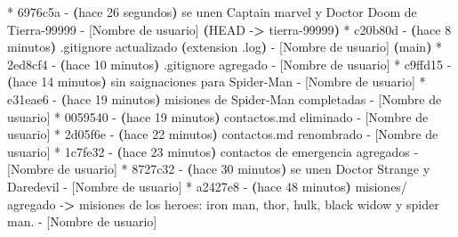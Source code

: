 \documentclass[
]{book}
\newenvironment{Shaded}{\begin{snugshade}}{\end{snugshade}}
\newcommand{\AttributeTok}[1]{\textcolor[rgb]{0.13,0.29,0.53}{#1}}
\newcommand{\ErrorTok}[1]{\textcolor[rgb]{0.64,0.00,0.00}{\textbf{#1}}}
\newcommand{\ExtensionTok}[1]{#1}
\newcommand{\KeywordTok}[1]{\textcolor[rgb]{0.13,0.29,0.53}{\textbf{#1}}}
\newcommand{\NormalTok}[1]{#1}
\newcommand{\OperatorTok}[1]{\textcolor[rgb]{0.81,0.36,0.00}{\textbf{#1}}}
\begin{document}
\begin{Shaded}
\begin{Highlighting}[]
\ExtensionTok{*}\NormalTok{ 6976c5a }\AttributeTok{{-}} \ErrorTok{(}\ExtensionTok{hace}\NormalTok{ 26 segundos}\KeywordTok{)} \ExtensionTok{se}\NormalTok{ unen Captain marvel y Doctor Doom de Tierra{-}99999 }\AttributeTok{{-}}\NormalTok{ [Nombre de usuario] }\ErrorTok{(}\ExtensionTok{HEAD} \AttributeTok{{-}}\OperatorTok{\textgreater{}}\NormalTok{ tierra{-}99999}\KeywordTok{)}
\ExtensionTok{*}\NormalTok{ c20b80d }\AttributeTok{{-}} \ErrorTok{(}\ExtensionTok{hace}\NormalTok{ 8 minutos}\KeywordTok{)} \ExtensionTok{.gitignore}\NormalTok{ actualizado }\ErrorTok{(}\ExtensionTok{extension}\NormalTok{ .log}\KeywordTok{)} \ExtensionTok{{-}}\NormalTok{ [Nombre de usuario] }\ErrorTok{(}\ExtensionTok{main}\KeywordTok{)}
\ExtensionTok{*}\NormalTok{ 2ed8cf4 }\AttributeTok{{-}} \ErrorTok{(}\ExtensionTok{hace}\NormalTok{ 10 minutos}\KeywordTok{)} \ExtensionTok{.gitignore}\NormalTok{ agregado }\AttributeTok{{-}}\NormalTok{ [Nombre de usuario]}
\ExtensionTok{*}\NormalTok{ c9ffd15 }\AttributeTok{{-}} \ErrorTok{(}\ExtensionTok{hace}\NormalTok{ 14 minutos}\KeywordTok{)} \ExtensionTok{sin}\NormalTok{ saignaciones para Spider{-}Man }\AttributeTok{{-}}\NormalTok{ [Nombre de usuario]}
\ExtensionTok{*}\NormalTok{ e31eae6 }\AttributeTok{{-}} \ErrorTok{(}\ExtensionTok{hace}\NormalTok{ 19 minutos}\KeywordTok{)} \ExtensionTok{misiones}\NormalTok{ de Spider{-}Man completadas }\AttributeTok{{-}}\NormalTok{ [Nombre de usuario]}
\ExtensionTok{*}\NormalTok{ 0059540 }\AttributeTok{{-}} \ErrorTok{(}\ExtensionTok{hace}\NormalTok{ 19 minutos}\KeywordTok{)} \ExtensionTok{contactos.md}\NormalTok{ eliminado }\AttributeTok{{-}}\NormalTok{ [Nombre de usuario]}
\ExtensionTok{*}\NormalTok{ 2d05f6e }\AttributeTok{{-}} \ErrorTok{(}\ExtensionTok{hace}\NormalTok{ 22 minutos}\KeywordTok{)} \ExtensionTok{contactos.md}\NormalTok{ renombrado }\AttributeTok{{-}}\NormalTok{ [Nombre de usuario]}
\ExtensionTok{*}\NormalTok{ 1c7fe32 }\AttributeTok{{-}} \ErrorTok{(}\ExtensionTok{hace}\NormalTok{ 23 minutos}\KeywordTok{)} \ExtensionTok{contactos}\NormalTok{ de emergencia agregados }\AttributeTok{{-}}\NormalTok{ [Nombre de usuario]}
\ExtensionTok{*}\NormalTok{ 8727c32 }\AttributeTok{{-}} \ErrorTok{(}\ExtensionTok{hace}\NormalTok{ 30 minutos}\KeywordTok{)} \ExtensionTok{se}\NormalTok{ unen Doctor Strange y Daredevil }\AttributeTok{{-}}\NormalTok{ [Nombre de usuario]}
\ExtensionTok{*}\NormalTok{ a2427e8 }\AttributeTok{{-}} \ErrorTok{(}\ExtensionTok{hace}\NormalTok{ 48 minutos}\KeywordTok{)} \ExtensionTok{misiones/}\NormalTok{ agregado }\AttributeTok{{-}}\OperatorTok{\textgreater{}}\NormalTok{ misiones de los heroes: iron man, thor, hulk, black widow y spider man. }\AttributeTok{{-}}\NormalTok{ [Nombre de usuario]}

\end{Highlighting}
\end{Shaded}
\end{document}
